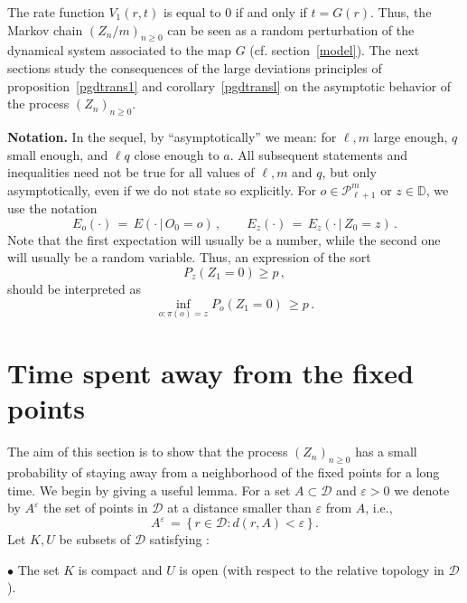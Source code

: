 \documentclass[a4paper,12pt]{article}
\theoremstyle{definition}
\theoremstyle{remark}
\def \cD {\mathcal{D}}
\def \cP {\mathcal{P}}
\def \e {\varepsilon}
\def \dD {\mathbb{D}}
\def \Zt {(Z_n)_{n\geq 0}}
\def \pml {\cP^m_{\ell +1}}
\begin{document}
The rate function $V_1(r,t)$ is equal to 0
if and only if
$t=G(r)$.
Thus,
the Markov chain
$(Z_n/m)_{n\geq0}$
can be seen as a random perturbation of the dynamical system
associated to the map $G$ (cf. section~\ref{model}).
The next sections study the consequences of the large deviations principles
of proposition~\ref{pgdtrans1} and corollary~\ref{pgdtransl}
on the asymptotic behavior of the process $\Zt$.

\textbf{Notation.}
In the sequel, by ``asymptotically'' we mean:
for $\ell,m$ large enough, $q$ small enough, and $\ell q$ close enough to $a$. All subsequent statements and inequalities need not be true for all
values of $\ell,m$ and $q$, but only asymptotically, even if we do not
state so explicitly.
For $o\in\pml$ or $z\in\dD$, we use the notation
$$E_o(\cdot)\,=\,E(\cdot\,|\,O_0=o)\,,\qquad
E_z(\cdot)\,=\,E_z(\cdot\,|\,Z_0=z)\,.$$
Note that the first expectation will usually be a number,
while the second one will usually be a random variable.
Thus, an expression of the sort
$$P_z(Z_1=0)\geq p\,,$$
should be interpreted as
$$\inf_{o:\pi(o)=z}P_o(Z_1=0)\,\geq p\,.$$

\section{Time spent away from the fixed points}\label{awayfp}
The aim of this section is to show that the process $\Zt$ 
has a small probability of staying away from a neighborhood of the fixed points
for a long time.
We begin by giving a useful lemma.
For a set $A\subset \cD$ and $\e>0$ we denote by $A^\e$ 
the set of points in $\cD$ at a distance smaller than $\e$ from $A$, i.e.,
$$A^\e\,=\,\big\lbrace\,
r\in\cD:d(r,A)<\e
\,\big\rbrace\,.$$
Let $K,U$ be subsets of $\cD$ satisfying :

$\bullet$ The set $K$ is compact and $U$ is open (with respect to the relative topology in $\cD$).
\end{document}
